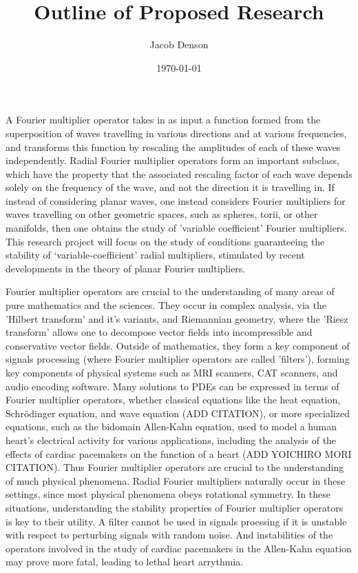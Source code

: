 \documentclass[12pt]{article}
\title{Outline of Proposed Research}
\author{Jacob Denson}
\date{\today}
\theoremstyle{plain}
\theoremstyle{remark}
\theoremstyle{definition}
\begin{document}
\maketitle

A Fourier multiplier operator takes in as input a function formed from the superposition of waves travelling in various directions and at various frequencies, and transforms this function by rescaling the amplitudes of each of these waves independently. Radial Fourier multiplier operators form an important subclass, which have the property that the associated rescaling factor of each wave depends solely on the frequency of the wave, and not the direction it is travelling in. If instead of considering planar waves, one instead considers Fourier multipliers for waves travelling on other geometric spaces, such as spheres, torii, or other manifolds, then one obtains the study of 'variable coefficient' Fourier multipliers. This research project will focus on the study of conditions guaranteeing the stability of `variable-coefficient' radial multipliers, stimulated by recent developments in the theory of planar Fourier multipliers.

Fourier multiplier operators are crucial to the understanding of many areas of pure mathematics and the sciences. They occur in complex analysis, via the 'Hilbert transform' and it's variants, and Riemannian geometry, where the 'Riesz transform' allows one to decompose vector fields into incompressible and conservative vector fields. Outside of mathematics, they form a key component of signals processing (where Fourier multiplier operators are called 'filters'), forming key components of physical systems such as MRI scanners, CAT scanners, and audio encoding software. Many solutions to PDEs can be expressed in terms of Fourier multiplier operators, whether classical equations like the heat equation, Schr\"{o}dinger equation, and wave equation (ADD CITATION), or more specialized equations, such as the bidomain Allen-Kahn equation, used to model a human heart's electrical activity for various applications, including the analysis of the effects of cardiac pacemakers on the function of a heart (ADD YOICHIRO MORI CITATION). Thus Fourier multiplier operators are crucial to the understanding of much physical phenomena. Radial Fourier multipliers naturally occur in these settings, since most physical phenomena obeys rotational symmetry. In these situations, understanding the stability properties of Fourier multiplier operators is key to their utility. A filter cannot be used in signals proessing if it is unstable with respect to perturbing signals with random noise. And instabilities of the operators involved in the study of cardiac pacemakers in the Allen-Kahn equation may prove more fatal, leading to lethal heart arrythmia.
\end{document}
